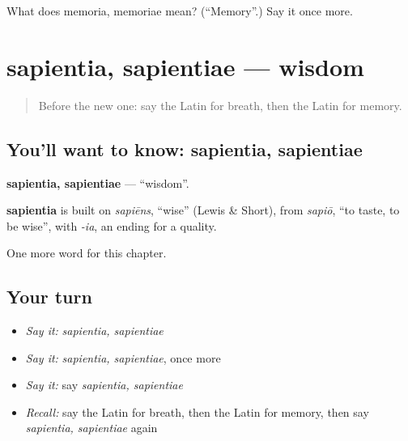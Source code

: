 \begin{tcolorbox}[breakable,colback=teal!4,colframe=teal!35!black,title={Before you move on}]
What does memoria, memoriae mean? (\textquotedblleft{}Memory\textquotedblright{}.) Say it once more.
\end{tcolorbox}
\section[sapientia, sapientiae]{sapientia, sapientiae — wisdom}

\label{lesson:LA-C206-sapientia}



\begin{quote}
Before the new one: say the Latin for breath, then the Latin for memory.
\end{quote}

\subsection*{You'll want to know: sapientia, sapientiae}
\textbf{sapientia, sapientiae} — \textquotedblleft{}wisdom\textquotedblright{}.

\begin{cousinweb}
\textbf{sapientia} is built on \emph{sapiēns}, \textquotedblleft{}wise\textquotedblright{} (Lewis \& Short), from \emph{sapiō}, \textquotedblleft{}to taste, to be wise\textquotedblright{}, with \emph{-ia}, an ending for a quality.
\end{cousinweb}

\begin{grammarlens}[title={What you've built}]
One more word for this chapter.
\end{grammarlens}

\subsection*{Your turn}
\begin{itemize}
\raggedright
  \item \emph{Say it:} \emph{sapientia, sapientiae}
  \item \emph{Say it:} \emph{sapientia, sapientiae}, once more
  \item \emph{Say it:} say \emph{sapientia, sapientiae}
  \item \emph{Recall:} say the Latin for breath, then the Latin for memory, then say \emph{sapientia, sapientiae} again
\end{itemize}

